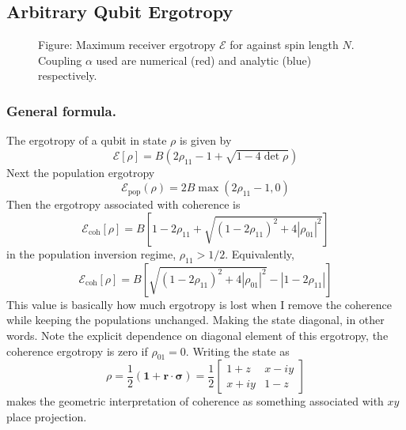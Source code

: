 \documentclass[../../../main.tex]{subfiles}
\begin{document}
\subsection{Arbitrary Qubit Ergotropy}

\begin{figure}
  \centering
  \caption*{Figure:  Maximum receiver ergotropy $\mathcal{E}$ for against spin length $N$. Coupling $\alpha$ used are numerical (red) and analytic (blue) respectively.}
\end{figure}

\subsubsection{General formula.}
The ergotropy of a qubit in state $\rho$ is given by
\begin{equation*}
  \mathcal{E} [\rho]
  = B(2\rho_{11}- 1 + \sqrt{1-4 \det \rho})
\end{equation*}
Next the population ergotropy
\begin{equation*}
  \mathcal{E}_\text{pop}(\rho)
  = 2B \max (2\rho_{11}-1,0)
\end{equation*}
Then the ergotropy associated with coherence is
\begin{equation*}
  \mathcal{E}_\text{coh}[\rho]
  = B \left[  1 - 2 \rho_{11} + \sqrt{(1-2\rho_{11})^2+ 4|\rho_{01}|^2}  \right]
\end{equation*}
in the population inversion regime, $\rho_{11}>1/2$.
Equivalently,
\begin{equation*}
  \mathcal E_{\mathrm{coh}}[\rho]
=B\left[\sqrt{(1-2\rho_{11})^2+4|\rho_{01}|^2}-|1-2\rho_{11}|\right]
\end{equation*}
This value is basically how much ergotropy is lost when I remove the coherence while keeping the populations unchanged.
Making the state diagonal, in other words.
Note the explicit dependence on diagonal element of this ergotropy, the coherence ergotropy is zero if $\rho_{01}=0$.
Writing the state as
\begin{equation*}
  \rho
  =
  \frac12\left(\mathbf{1}+\mathbf r\cdot\boldsymbol{\sigma}\right)
  =
  \frac12
  \begin{bmatrix}
    1+z  & x-iy \\
    x+iy & 1-z
  \end{bmatrix}
\end{equation*}
makes the geometric interpretation of coherence as something associated with $xy$ place projection.
\end{document}
